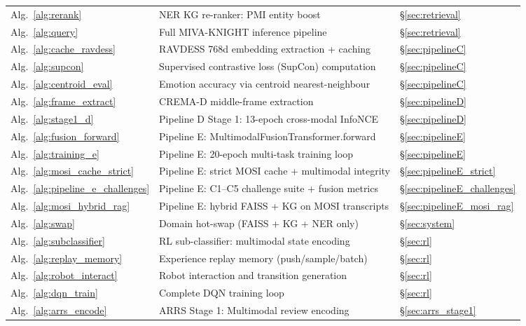\documentclass[12pt,a4paper]{article}
\theoremstyle{definition}
\theoremstyle{plain}
\theoremstyle{remark}
\begin{document}
\begin{longtable}{p{4.0cm}p{7.0cm}p{3.2cm}}
Alg.~\ref{alg:rerank} & NER KG re-ranker: PMI entity boost & \S\ref{sec:retrieval} \\[3pt]
Alg.~\ref{alg:query} & Full MIVA-KNIGHT inference pipeline & \S\ref{sec:retrieval} \\[3pt]
Alg.~\ref{alg:cache_ravdess} & RAVDESS 768d embedding extraction + caching & \S\ref{sec:pipelineC} \\[3pt]
Alg.~\ref{alg:supcon} & Supervised contrastive loss (SupCon) computation & \S\ref{sec:pipelineC} \\[3pt]
Alg.~\ref{alg:centroid_eval} & Emotion accuracy via centroid nearest-neighbour & \S\ref{sec:pipelineC} \\[3pt]
Alg.~\ref{alg:frame_extract} & CREMA-D middle-frame extraction & \S\ref{sec:pipelineD} \\[3pt]
Alg.~\ref{alg:stage1_d} & Pipeline D Stage 1: 13-epoch cross-modal InfoNCE & \S\ref{sec:pipelineD} \\[3pt]
Alg.~\ref{alg:fusion_forward} & Pipeline E: MultimodalFusionTransformer.forward & \S\ref{sec:pipelineE} \\[3pt]
Alg.~\ref{alg:training_e} & Pipeline E: 20-epoch multi-task training loop & \S\ref{sec:pipelineE} \\[3pt]
Alg.~\ref{alg:mosi_cache_strict} & Pipeline E: strict MOSI cache + multimodal integrity & \S\ref{sec:pipelineE_strict} \\[3pt]
Alg.~\ref{alg:pipeline_e_challenges} & Pipeline E: C1--C5 challenge suite + fusion metrics & \S\ref{sec:pipelineE_challenges} \\[3pt]
Alg.~\ref{alg:mosi_hybrid_rag} & Pipeline E: hybrid FAISS + KG on MOSI transcripts & \S\ref{sec:pipelineE_mosi_rag} \\[3pt]
Alg.~\ref{alg:swap} & Domain hot-swap (FAISS + KG + NER only) & \S\ref{sec:system} \\[3pt]
Alg.~\ref{alg:subclassifier} & RL sub-classifier: multimodal state encoding & \S\ref{sec:rl} \\[3pt]
Alg.~\ref{alg:replay_memory} & Experience replay memory (push/sample/batch) & \S\ref{sec:rl} \\[3pt]
Alg.~\ref{alg:robot_interact} & Robot interaction and transition generation & \S\ref{sec:rl} \\[3pt]
Alg.~\ref{alg:dqn_train} & Complete DQN training loop & \S\ref{sec:rl} \\[3pt]
Alg.~\ref{alg:arrs_encode} & ARRS Stage 1: Multimodal review encoding & \S\ref{sec:arrs_stage1} \\[3pt]

\end{longtable}
\end{document}
